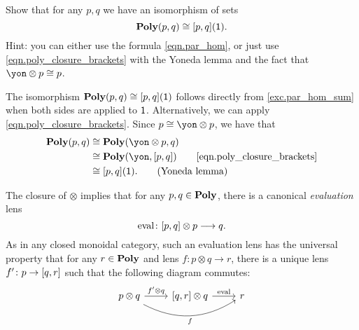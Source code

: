 \documentclass[Book-Poly]{subfiles}
\begin{document}
\begin{exercise}\label{exc.poly_plug_1}
Show that for any $p,q$ we have an isomorphism of sets
\[
\mathbf{Poly}(p,q) \cong [p,q](\textsf{1}).
\]
Hint: you can either use the formula \eqref{eqn.par_hom}, or just use
\eqref{eqn.poly_closure_brackets} with the Yoneda lemma and the fact that $\yon\otimes p \iso p$.
\begin{solution}
The isomorphism $\mathbf{Poly}(p,q) \cong [p,q](\textsf{1})$ follows directly from \cref{exc.par_hom_sum} when both sides are applied to $\textsf{1}$.
Alternatively, we can apply \eqref{eqn.poly_closure_brackets}.
Since $p \iso \yon \otimes p$, we have that
\begin{align*}
    \poly(p, q) &\iso \poly(\yon \otimes p, q) \\
    &\iso \poly(\yon, \ihom{p,q}) \tag*{\eqref{eqn.poly_closure_brackets}} \\
    &\iso \ihom{p,q}(\1). \tag{Yoneda lemma}
\end{align*}
\end{solution}
\end{exercise}

The closure of $\otimes$ implies that for any $p,q\in\mathbf{Poly}$, there is a canonical \emph{evaluation} lens
\begin{equation}\label{eqn.eval_parallel}
  \mathrm{eval}\colon [p,q]\otimes p\longrightarrow q.
\end{equation}
As in any closed monoidal category, such an evaluation lens has the universal property that for any $r\in\mathbf{Poly}$ and lens $f\colon p\otimes q\to r$, there is a unique lens $f'\colon p\to[q,r]$ such that the following diagram commutes:
\[
    \begin{tikzcd}
    	p\otimes q\ar[r, "f'\otimes q"]\ar[rr, bend right, "f"']&
    	{\ihom{q,r}}\otimes q\ar[r, "\fun{eval}"]&
    	r
    \end{tikzcd}
\]
\end{document}
